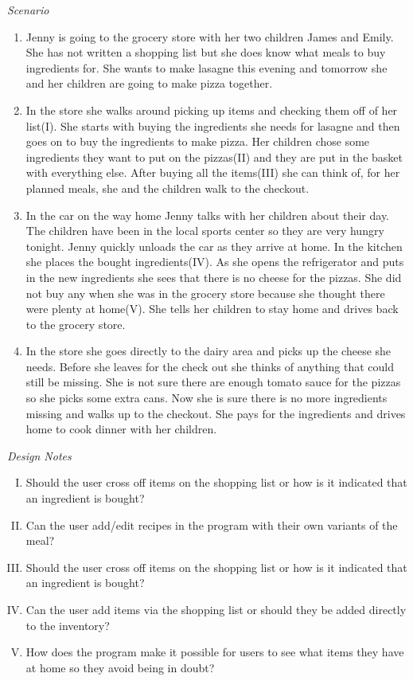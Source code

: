 \emph{Scenario}
\begin{enumerate}
\item Jenny is going to the grocery store with her two children James and Emily. She has not written a shopping list but she does know what meals to buy ingredients for. She wants to make lasagne this evening and tomorrow she and her children are going to make pizza together. 
\item In the store she walks around picking up items and checking them off of her list(I). She starts with buying the ingredients she needs for lasagne and then goes on to buy the ingredients to make pizza. Her children chose some ingredients they want to put on the pizzas(II) and they are put in the basket with everything else. After buying all the items(III) she can think of, for her planned meals, she and the children walk to the checkout. 
\item In the car on the way home Jenny talks with her children about their day. The children have been in the local sports center so they are very hungry tonight. Jenny quickly unloads the car as they arrive at home. In the kitchen she places the bought ingredients(IV). As she opens the refrigerator and puts in the new ingredients she sees that there is no cheese for the pizzas. She did not buy any when she was in the grocery store because she thought there were plenty at home(V). She tells her children to stay home and drives back to the grocery store.
\item In the store she goes directly to the dairy area and picks up the cheese she needs. Before she leaves for the check out she thinks of anything that could still be missing. She is not sure there are enough tomato sauce for the pizzas so she picks some extra cans. Now she is sure there is no more ingredients missing and walks up to the checkout. She pays for the ingredients and drives home to cook dinner with her children.  
\end{enumerate}

\emph{Design Notes}

\begin{enumerate} [(I)]
\item Should the user cross off items on the shopping list or how is it indicated that an ingredient is bought?  
\item Can the user add/edit recipes in the program with their own variants of the meal?
\item Should the user cross off items on the shopping list or how is it indicated that an ingredient is bought? 
\item Can the user add items via the shopping list or should they be added directly to the inventory?
\item How does the program make it possible for users to see what items they have at home so they avoid being in doubt?
\end{enumerate}


